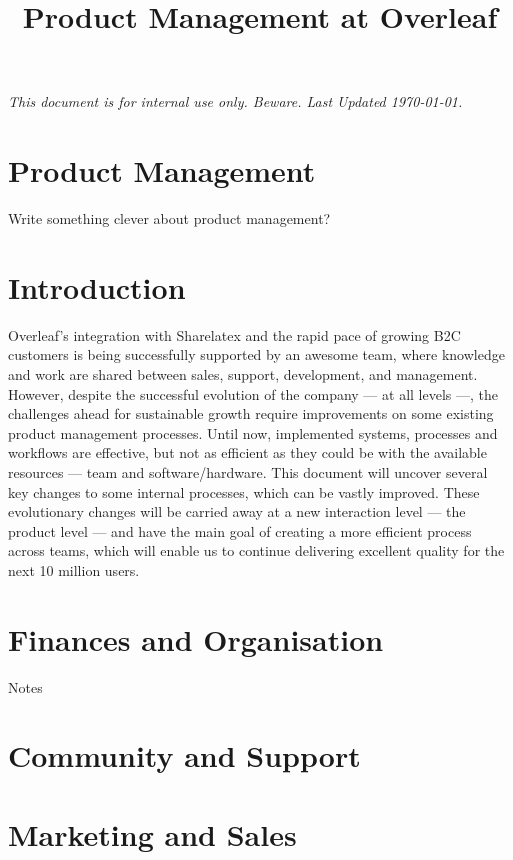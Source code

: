 \documentclass[11pt,a4paper,parskip=half]{scrartcl}
\title{Product Management at Overleaf}
\begin{document}
\maketitle
\vspace{-1em}
\textit{This document is for internal use only. Beware. Last Updated \today.}

\section*{Product Management} 

Write something clever about product management?

\tableofcontents
\newpage 

\section{Introduction}
Overleaf’s integration with Sharelatex and the rapid pace of growing B2C customers is being successfully supported by an awesome team, where knowledge and work are shared between sales, support, development, and management.
However, despite the successful evolution of the company — at all levels —, the challenges ahead for sustainable growth require improvements on some existing product management processes. Until now, implemented systems, processes and workflows are effective, but not as efficient as they could be with the available resources — team and software/hardware.
This document will uncover several key changes to some internal processes, which can be vastly improved. These evolutionary changes will be carried away at a new interaction level — the product level — and have the main goal of creating a more efficient process across teams, which will enable us to continue delivering excellent quality for the next 10 million users.

\section{Finances and Organisation}
Notes

\section{Community and Support}

\section{Marketing and Sales}
\end{document}
